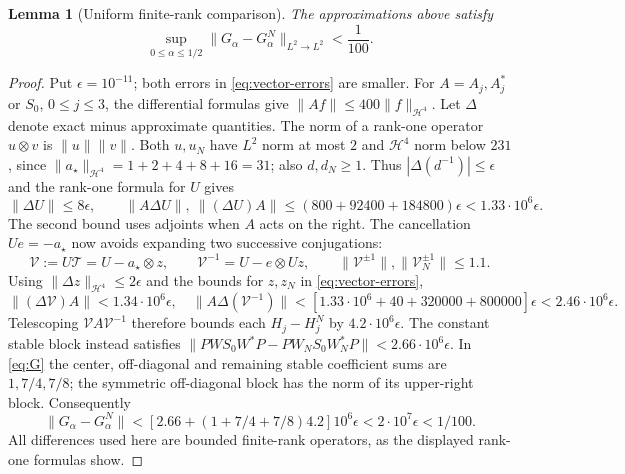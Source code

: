 \documentclass[a4paper,11pt]{article}
\numberwithin{equation}{section}
\newtheorem{lemma}[theorem]{Lemma}
\theoremstyle{definition}
\theoremstyle{remark}
\newcommand{\norm}[1]{\lVert#1\rVert}
\newcommand{\calT}{\mathcal T}
\newcommand{\avec}{a_\star}
\begin{document}
\begin{lemma}[Uniform finite-rank comparison]\label{lem:comparison}
The approximations above satisfy
\begin{equation}\label{eq:comparison-small}
 \sup_{0\le\alpha\le1/2}\norm{G_\alpha-G_\alpha^N}_{L^2\to L^2}<\frac1{100}.
\end{equation}
\end{lemma}
\begin{proof}
Put $\epsilon=10^{-11}$; both errors in \eqref{eq:vector-errors} are smaller.
For $A=A_j,A_j^*$ or $S_0$, $0\le j\le3$, the differential formulas give
$\norm{Af}\le400\norm f_{\mathcal H^4}$. Let $\Delta$ denote exact minus approximate quantities. The norm of a rank-one operator $u\otimes v$ is $\norm u\norm v$. Both $u,u_N$ have $L^2$ norm at most $2$ and $\mathcal H^4$ norm below $231$, since $\norm{\avec}_{\mathcal H^4}=1+2+4+8+16=31$; also $d,d_N\ge1$. Thus $|\Delta(d^{-1})|\le\epsilon$ and the rank-one formula for $U$ gives
\[
 \norm{\Delta U}\le8\epsilon,\qquad
 \norm{A\Delta U},\ \norm{(\Delta U)A}
 \le(800+92400+184800)\epsilon<1.33\cdot10^6\epsilon.
\]
The second bound uses adjoints when $A$ acts on the right.
The cancellation $Ue=-\avec$ now avoids expanding two successive conjugations:
\[
 \mathscr V:=U\calT=U-\avec\otimes z,\qquad
 \mathscr V^{-1}=U-e\otimes Uz,\qquad
 \norm{\mathscr V^{\pm1}},\norm{\mathscr V_N^{\pm1}}\le1.1.
\]
Using $\norm{\Delta z}_{\mathcal H^4}\le2\epsilon$ and the bounds for $z,z_N$ in \eqref{eq:vector-errors},
\[
 \norm{(\Delta\mathscr V)A}<1.34\cdot10^6\epsilon,
 \quad
 \norm{A\Delta(\mathscr V^{-1})}
 <[1.33\cdot10^6+40+320000+800000]\epsilon
 <2.46\cdot10^6\epsilon.
\]
Telescoping $\mathscr VA\mathscr V^{-1}$ therefore bounds each $H_j-H_j^N$ by $4.2\cdot10^6\epsilon$. The constant stable block instead satisfies $\norm{PW S_0W^*P-PW_NS_0W_N^*P}<2.66\cdot10^6\epsilon$. In \eqref{eq:G} the center, off-diagonal and remaining stable coefficient sums are $1,7/4,7/8$; the symmetric off-diagonal block has the norm of its upper-right block. Consequently
\[
 \norm{G_\alpha-G_\alpha^N}
 <[2.66+(1+7/4+7/8)4.2]10^6\epsilon<2\cdot10^7\epsilon<1/100.
\]
All differences used here are bounded finite-rank operators, as the displayed rank-one formulas show.
\end{proof}
\end{document}
